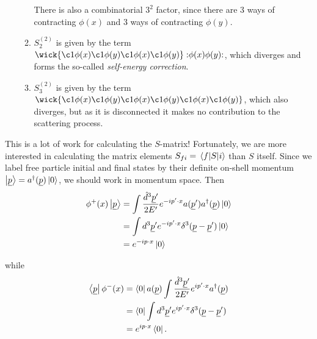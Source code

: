 \documentclass{article}
\numberwithin{equation}{section}
\newcommand{\normord}[1]{:\mathrel{#1}:}
\begin{document}
\begin{enumerate}
\begin{enumerate}
        There is also a combinatorial $3^2$ factor, since there are 3 ways of contracting $\phi(x)$ and 3 ways of contracting $\phi(y)$.
        \item $S_2^{(2)}$ is given by the term $\wick{\c1\phi(x)\c1\phi(y)\c1\phi(x)\c1\phi(y)} \normord{\phi(x)\phi(y)}$, which diverges and forms the so-called \textit{self-energy correction}.
        \item $S_3^{(2)}$ is given by the term $\wick{\c1\phi(x)\c1\phi(y)\c1\phi(x)\c1\phi(y)\c1\phi(x)\c1\phi(y)}$, which also diverges, but as it is disconnected it makes no contribution to the scattering process.
    \end{enumerate}
\end{enumerate}

This is a lot of work for calculating the $S$-matrix! Fortunately, we are more interested in calculating the matrix elements $S_{fi} = \mel{f}{S}{i}$ than $S$ itself. Since we label free particle initial and final states by their definite on-shell momentum $\ket{\underline{p}} = a^\dagger(\underline{p})\ket{0}$, we should work in momentum space. Then
\begin{equation} \label{eq:phiplusp}
\begin{aligned}
    \phi^+(x)\ket{\underline{p}} &= \int  \frac{\hat{d}^3 \underline{p}'}{2E'} e^{-ip'\cdot x} a(\underline{p}')a^\dagger(\underline{p})\ket{0} \\
    &= \int d^3 \underline{p}'   e^{-ip'\cdot x} \delta^3(\underline{p}-\underline{p}')\ket{0} \\
    &= e^{-ip\cdot x}\ket{0}
\end{aligned}
\end{equation}

while
\begin{equation} \label{eq:phiminusp}
\begin{aligned}
    \bra{\underline{p}}\phi^-(x) &= \bra{0} a(\underline{p}) \int \frac{\hat{d}^3 \underline{p}'}{2E'} e^{ip'\cdot x} a^\dagger(\underline{p}) \\
    &= \bra{0} \int d^3 \underline{p}' e^{ip'\cdot x} \delta^3(\underline{p}-\underline{p}') \\
    &= e^{ip\cdot x} \bra{0}.
\end{aligned}
\end{equation}
\end{document}
